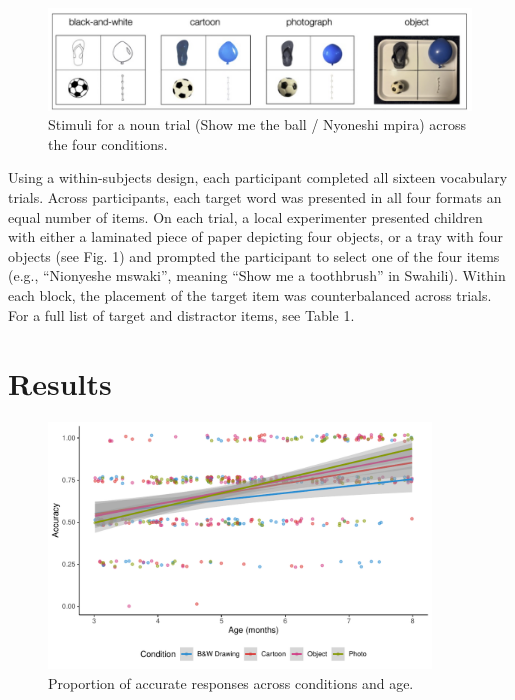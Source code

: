 \documentclass[10pt, letterpaper]{article}
\begin{document}
\begin{CodeChunk}
\begin{figure}[tb]

{\centering \includegraphics[width=6in]{fig1} 

}

\caption[Stimuli for a noun trial (Show me the ball / Nyoneshi mpira) across the four conditions]{Stimuli for a noun trial (Show me the ball / Nyoneshi mpira) across the four conditions.}\label{fig:figure1}
\end{figure}
\end{CodeChunk}

Using a within-subjects design, each participant completed all sixteen
vocabulary trials. Across participants, each target word was presented
in all four formats an equal number of items. On each trial, a local
experimenter presented children with either a laminated piece of paper
depicting four objects, or a tray with four objects (see Fig. 1) and
prompted the participant to select one of the four items (e.g.,
``Nionyeshe mswaki'', meaning ``Show me a toothbrush'' in Swahili).
Within each block, the placement of the target item was counterbalanced
across trials. For a full list of target and distractor items, see Table
1.

\section{Results}\label{results}

\begin{CodeChunk}
\begin{figure}[tb]

{\centering \includegraphics[width=4in]{figs/fig2-1} 

}

\caption[Proportion of accurate responses across conditions and age]{Proportion of accurate responses across conditions and age.}\label{fig:fig2}
\end{figure}
\end{CodeChunk}
\end{document}
